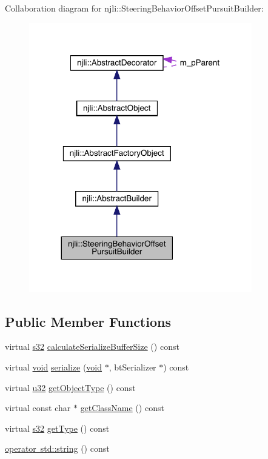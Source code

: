 Collaboration diagram for njli\+:\+:Steering\+Behavior\+Offset\+Pursuit\+Builder\+:\nopagebreak
\begin{figure}[H]
\begin{center}
\leavevmode
\includegraphics[width=275pt]{classnjli_1_1_steering_behavior_offset_pursuit_builder__coll__graph}
\end{center}
\end{figure}
\subsection*{Public Member Functions}
\begin{DoxyCompactItemize}
\item 
virtual \mbox{\hyperlink{_util_8h_aa62c75d314a0d1f37f79c4b73b2292e2}{s32}} \mbox{\hyperlink{classnjli_1_1_steering_behavior_offset_pursuit_builder_ae4cdd2d031be57550b1e0fc763013558}{calculate\+Serialize\+Buffer\+Size}} () const
\item 
virtual \mbox{\hyperlink{_thread_8h_af1e856da2e658414cb2456cb6f7ebc66}{void}} \mbox{\hyperlink{classnjli_1_1_steering_behavior_offset_pursuit_builder_a5d798873d91fc0a4d987b816e79e2cdd}{serialize}} (\mbox{\hyperlink{_thread_8h_af1e856da2e658414cb2456cb6f7ebc66}{void}} $\ast$, bt\+Serializer $\ast$) const
\item 
virtual \mbox{\hyperlink{_util_8h_a10e94b422ef0c20dcdec20d31a1f5049}{u32}} \mbox{\hyperlink{classnjli_1_1_steering_behavior_offset_pursuit_builder_a3cd3001a77bb55273675797565071b04}{get\+Object\+Type}} () const
\item 
virtual const char $\ast$ \mbox{\hyperlink{classnjli_1_1_steering_behavior_offset_pursuit_builder_a49be76d9201bf181af5e96ae368e90e9}{get\+Class\+Name}} () const
\item 
virtual \mbox{\hyperlink{_util_8h_aa62c75d314a0d1f37f79c4b73b2292e2}{s32}} \mbox{\hyperlink{classnjli_1_1_steering_behavior_offset_pursuit_builder_afebe863fcc6d4ea34b66d03a149eb51c}{get\+Type}} () const
\item 
\mbox{\hyperlink{classnjli_1_1_steering_behavior_offset_pursuit_builder_aefb4cd79488a32db5dd634a85dff6525}{operator std\+::string}} () const
\end{DoxyCompactItemize}
